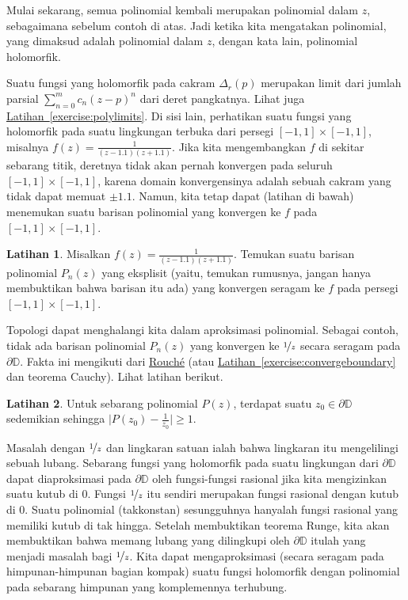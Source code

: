 \documentclass[12pt,openany]{book}
\newcommand{\babs}[1]{\bigl\lvert {#1} \bigr\rvert}
\newcommand{\D}{{\mathbb{D}}}
\theoremstyle{plain}
\theoremstyle{remark}
\theoremstyle{definition}
\newenvironment{exbox}{%
    \def\FrameCommand{\vrule width 1pt \relax\hspace{10pt}}%
    \MakeFramed{\advance\hsize-\width\FrameRestore}%
}{%
    \endMakeFramed
}
\theoremstyle{exercise}
\newtheorem{exercise}{Latihan}[section]
\theoremstyle{example}
\newcommand{\exerciseref}[1]{\hyperref[#1]{Latihan~\ref*{#1}}}
\begin{document}
Mulai sekarang, semua polinomial kembali merupakan polinomial dalam $z$, sebagaimana
sebelum contoh di atas.  Jadi ketika kita mengatakan polinomial, yang dimaksud adalah
polinomial dalam $z$, dengan kata lain, polinomial holomorfik.

Suatu fungsi yang holomorfik pada cakram $\Delta_r(p)$ merupakan limit dari jumlah parsial
$\sum_{n=0}^m c_n {(z-p)}^n$
dari deret pangkatnya.  Lihat juga
\exerciseref{exercise:polylimits}.  Di sisi lain, perhatikan suatu fungsi 
yang holomorfik pada suatu lingkungan terbuka dari persegi $[-1,1] \times [-1,1]$, misalnya
$f(z) = \frac{1}{(z-1.1)(z+1.1)}$.  Jika kita mengembangkan $f$ di sekitar sebarang titik, deretnya
tidak akan pernah konvergen pada seluruh $[-1,1] \times [-1,1]$, karena domain
konvergensinya adalah sebuah cakram yang tidak dapat memuat $\pm 1.1$.  Namun, kita tetap dapat
(latihan di bawah) menemukan suatu barisan polinomial yang konvergen ke $f$
pada $[-1,1] \times [-1,1]$.

\begin{exbox}
\begin{exercise}
Misalkan 
$f(z) = \frac{1}{(z-1.1)(z+1.1)}$.  Temukan suatu barisan polinomial
$P_n(z)$ yang eksplisit (yaitu, temukan
rumusnya, jangan hanya membuktikan bahwa barisan itu ada)
yang konvergen seragam ke $f$ pada persegi $[-1,1] \times [-1,1]$.
\end{exercise}
\end{exbox}

Topologi dapat menghalangi kita dalam aproksimasi polinomial.
Sebagai contoh, tidak ada barisan
polinomial $P_n(z)$ yang konvergen ke $\nicefrac{1}{z}$ secara seragam pada $\partial
\D$.  Fakta ini mengikuti dari \hyperref[thm:rouche]{Rouch\'e} (atau
\exerciseref{exercise:convergeboundary} dan teorema Cauchy).
Lihat
latihan berikut.

\begin{exbox}
\begin{exercise}
Untuk sebarang polinomial $P(z)$, terdapat suatu $z_0 \in \partial \D$ sedemikian sehingga
$\babs{P(z_0)-\frac{1}{z_0}} \geq 1$.
\end{exercise}
\end{exbox}

Masalah dengan $\nicefrac{1}{z}$ dan lingkaran satuan ialah bahwa lingkaran itu mengelilingi sebuah lubang.
Sebarang fungsi yang holomorfik pada suatu lingkungan dari $\partial \D$ dapat
diaproksimasi pada $\partial \D$ oleh fungsi-fungsi rasional
jika kita mengizinkan suatu kutub di $0$.  Fungsi $\nicefrac{1}{z}$ itu sendiri
merupakan fungsi rasional dengan kutub di $0$.
Suatu polinomial (takkonstan) sesungguhnya hanyalah fungsi rasional yang memiliki kutub di tak hingga.
Setelah membuktikan teorema Runge, kita akan membuktikan bahwa memang lubang
yang dilingkupi oleh
$\partial \D$
itulah yang menjadi masalah bagi $\nicefrac{1}{z}$.
Kita dapat mengaproksimasi (secara seragam pada himpunan-himpunan bagian kompak) suatu fungsi holomorfik
dengan polinomial pada sebarang himpunan yang komplemennya terhubung.
\end{document}
